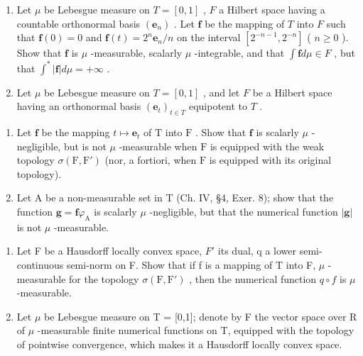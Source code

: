 \begin{enumerate}
\def\labelenumi{\arabic{enumi})}
\setcounter{enumi}{10}
\item
  Let \(\mu\) be Lebesgue measure on \(T = [0,1]\) , \(F\) a Hilbert space having a countable orthonormal basis \((\mathbf{e}_n)\) . Let \(\mathbf{f}\) be the mapping of \(T\) into \(F\) such that \(\mathbf{f}(0) = 0\) and \(\mathbf{f}(t) = 2^n \mathbf{e}_n / n\) on the interval \([2^{-n-1}, 2^{-n}]\) ( \(n \geqslant 0\) ). Show that \(\mathbf{f}\) is \(\mu\) -measurable, scalarly \(\mu\) -integrable, and that \(\int \mathbf{f} d\mu \in F\) , but that \(\int^* |\mathbf{f}| d\mu = +\infty\) .
\item
  Let \(\mu\) be Lebesgue measure on \(T = [0,1]\) , and let \(F\) be a Hilbert space having an orthonormal basis \((\mathbf{e}_t)_{t \in T}\) equipotent to \(T\) .
\end{enumerate}

\begin{enumerate}
\def\labelenumi{\alph{enumi})}
\item
  Let \(\mathbf{f}\) be the mapping \(t \mapsto \mathbf{e}_t\) of \(\mathrm{T}\) into \(\mathrm{F}\) . Show that \(\mathbf{f}\) is scalarly \(\mu\) -negligible, but is not \(\mu\) -measurable when \(\mathrm{F}\) is equipped with the weak topology \(\sigma(\mathrm{F}, \mathrm{F}')\) (nor, a fortiori, when \(\mathrm{F}\) is equipped with its original topology).
\item
  Let A be a non-measurable set in T (Ch. IV, §4, Exer. 8); show that the function \(\mathbf{g} = \mathbf{f}\varphi_{\mathrm{A}}\) is scalarly \(\mu\) -negligible, but that the numerical function \(|\mathbf{g}|\) is not \(\mu\) -measurable.
\end{enumerate}

\begin{enumerate}
\def\labelenumi{\arabic{enumi})}
\setcounter{enumi}{12}
\item
  Let F be a Hausdorff locally convex space, \(F'\) its dual, q a lower semi-continuous semi-norm on F. Show that if f is a mapping of T into F, \(\mu\) -measurable for the topology \(\sigma(\mathrm{F},\mathrm{F}')\) , then the numerical function \(q \circ f\) is \(\mu\) -measurable.
\item
  Let \(\mu\) be Lebesgue measure on T = {[}0,1{]}; denote by F the vector space over R of \(\mu\) -measurable finite numerical functions on T, equipped with the topology of pointwise convergence, which makes it a Hausdorff locally convex space.
\end{enumerate}

